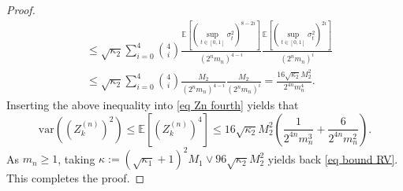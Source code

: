 \documentclass[12pt,reqno]{article}
\numberwithin{equation}{section}
\def\var{\mbox{var}}
\theoremstyle{definition}
\newcommand{\bE}{\mathbb{E}}
\begin{document}
\begin{proof}
\begin{equation*}
\begin{split}
			&\le \sqrt{\kappa_2} \sum_{i = 0}^{4} {4 \choose i} \frac{\bE\left[\left(\sup_{t \in [0,1]}\sigma^2_t\right)^{8 - 2i}\right]}{(2^n m_n)^{4-i}}\frac{\bE\left[\left(\sup_{t \in [0,1]}\sigma^2_t\right)^{2i}\right]}{(2^n m_n)^{i}} \\
			&\le \sqrt{\kappa_2} \sum_{i = 0}^{4} {4 \choose i} \frac{M_2}{\left(2^n m_n\right)^{4-i}}\frac{M_2}{\left(2^n m_n\right)^{i}}  = \frac{16\sqrt{\kappa_2}M_2^{2}}{2^{4n}m_n^4}.
		\end{split}
	\end{equation*}
	Inserting the above inequality into \eqref{eq Zn fourth} yields that 
	\begin{equation*}
		\var\left(\left(Z^{(n)}_k\right)^2\right) \le \bE\left[\left(Z^{(n)}_k\right)^4\right] \le 16\sqrt{\kappa_2}M_2^2\left(\frac{1}{2^{4n}m_n^3} + \frac{6}{2^{4n}m_n^2}\right).
	\end{equation*}
	As $m_n \ge 1$, taking $\kappa:= (\sqrt{\kappa_1} + 1)^2 M_1 \vee 96 \sqrt{\kappa_2}M_2^2$ yields back \eqref{eq bound RV}. This completes the proof.
\end{proof}
\end{document}
